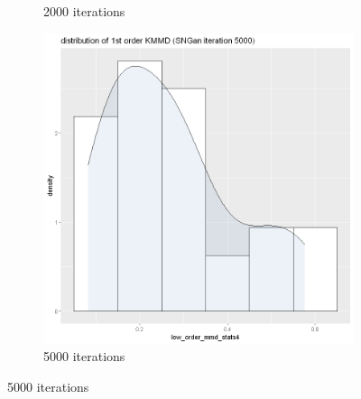 \documentclass{article}
\begin{document}
\begin{figure}[h!]
\begin{subfigure}[b]{0.3\textwidth}
         \caption{2000 iterations}
     \end{subfigure}
     \hfill
     \begin{subfigure}[b]{0.3\textwidth}
         \centering
         \includegraphics[width=\textwidth]{kmmd_figures/sngan_flower_lowdist_5000.png}
         \caption{5000 iterations}
     \end{subfigure}
\end{figure}
\end{document}
